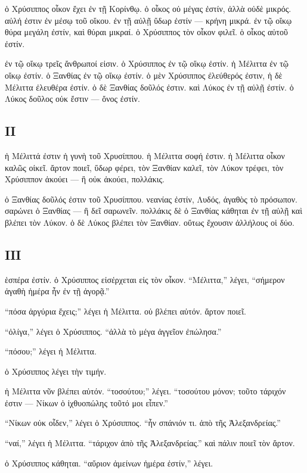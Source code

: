 \documentclass[a4paper]{report}
\begin{document}
ὁ Χρύσιππος οἶκον ἔχει ἐν τῇ Κορίνθῳ. ὁ οἶκος οὐ μέγας ἐστίν, ἀλλὰ οὐδὲ
μικρός. αὐλή ἐστιν ἐν μέσῳ τοῦ οἴκου. ἐν τῇ αὐλῇ ὕδωρ ἐστίν --- κρήνη
μικρά. ἐν τῷ οἴκῳ θύρα μεγάλη ἐστίν, καὶ θύραι μικραί. ὁ Χρύσιππος τὸν
οἶκον φιλεῖ. ὁ οἶκος αὐτοῦ ἐστίν.

ἐν τῷ οἴκῳ τρεῖς ἄνθρωποί εἰσιν. ὁ Χρύσιππος ἐν τῷ οἴκῳ ἐστίν. ἡ Μέλιττα
ἐν τῷ οἴκῳ ἐστίν. ὁ Ξανθίας ἐν τῷ οἴκῳ ἐστίν. ὁ μὲν Χρύσιππος ἐλεύθερός
ἐστιν, ἡ δὲ Μέλιττα ἐλευθέρα ἐστίν. ὁ δὲ Ξανθίας δοῦλός ἐστιν. καὶ Λύκος
ἐν τῇ αὐλῇ ἐστίν. ὁ Λύκος δοῦλος οὐκ ἔστιν --- ὄνος ἐστίν.

\subsection{ΙΙ}\label{ux3b9ux3b9-2}

ἡ Μέλιττά ἐστιν ἡ γυνὴ τοῦ Χρυσίππου. ἡ Μέλιττα σοφή ἐστιν. ἡ Μέλιττα
οἶκον καλῶς οἰκεῖ. ἄρτον ποιεῖ, ὕδωρ φέρει, τὸν Ξανθίαν καλεῖ, τὸν Λύκον
τρέφει, τὸν Χρύσιππον ἀκούει --- ἢ οὐκ ἀκούει, πολλάκις.

ὁ Ξανθίας δοῦλός ἐστιν τοῦ Χρυσίππου. νεανίας ἐστίν, Λυδός, ἀγαθὸς τὸ
πρόσωπον. σαρώνει ὁ Ξανθίας --- ἢ δεῖ σαρωνεῖν. πολλάκις δὲ ὁ Ξανθίας
κάθηται ἐν τῇ αὐλῇ καὶ βλέπει τὸν Λύκον. ὁ δὲ Λύκος βλέπει τὸν Ξανθίαν.
οὕτως ἔχουσιν ἀλλήλους οἱ δύο.

\subsection{ΙΙΙ}\label{ux3b9ux3b9ux3b9-2}

ἑσπέρα ἐστίν. ὁ Χρύσιππος εἰσέρχεται εἰς τὸν οἶκον. ``Μέλιττα,'' λέγει,
``σήμερον ἀγαθὴ ἡμέρα ἦν ἐν τῇ ἀγορᾷ.''

``πόσα ἀργύρια ἔχεις;'' λέγει ἡ Μέλιττα. οὐ βλέπει αὐτόν. ἄρτον ποιεῖ.

``ὀλίγα,'' λέγει ὁ Χρύσιππος. ``ἀλλὰ τὸ μέγα ἀγγεῖον ἐπώλησα.''

``πόσου;'' λέγει ἡ Μέλιττα.

ὁ Χρύσιππος λέγει τὴν τιμήν.

ἡ Μέλιττα νῦν βλέπει αὐτόν. ``τοσούτου;'' λέγει. ``τοσούτου μόνον; τοῦτο
τάριχόν ἐστιν --- Νίκων ὁ ἰχθυοπώλης τοῦτό μοι εἶπεν.''

``Νίκων οὐκ οἶδεν,'' λέγει ὁ Χρύσιππος. ``ἦν σπάνιόν τι. ἀπὸ τῆς
Ἀλεξανδρείας.''

``ναί,'' λέγει ἡ Μέλιττα. ``τάριχον ἀπὸ τῆς Ἀλεξανδρείας.'' καὶ πάλιν
ποιεῖ τὸν ἄρτον.

ὁ Χρύσιππος κάθηται. ``αὔριον ἀμείνων ἡμέρα ἐστίν,'' λέγει.
\end{document}
